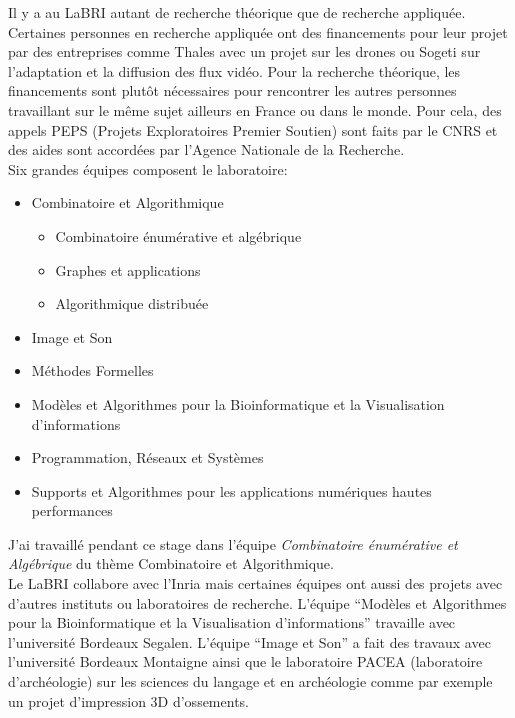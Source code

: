 \documentclass[a4paper]{article}
\begin{document}
Il y a au LaBRI autant de recherche théorique que de recherche appliquée. Certaines personnes en recherche appliquée ont des financements pour leur projet par des entreprises comme Thales avec un projet sur les drones ou Sogeti sur l'adaptation et la diffusion des flux vidéo. Pour la recherche théorique, les financements sont plutôt nécessaires pour rencontrer les autres personnes travaillant sur le même sujet ailleurs en France ou dans le monde. Pour cela, des appels PEPS (Projets Exploratoires Premier Soutien) sont faits par le CNRS et des aides sont accordées par l'Agence Nationale de la Recherche.\bigskip\\
Six grandes équipes composent le laboratoire:
\begin{itemize}
\item Combinatoire et Algorithmique
  \begin{itemize}
  \item Combinatoire énumérative et algébrique
  \item Graphes et applications
  \item Algorithmique distribuée
    \end{itemize}
\item Image et Son
\item Méthodes Formelles
\item Modèles et Algorithmes pour la Bioinformatique et la Visualisation d'informations
\item Programmation, Réseaux et Systèmes
\item Supports et Algorithmes pour les applications numériques hautes performances
\end{itemize}
\bigskip
J'ai travaillé pendant ce stage dans l'équipe \textit{Combinatoire énumérative et Algébrique} du thème Combinatoire et Algorithmique.\vspace{2\baselineskip}\\
\newpage
Le LaBRI collabore avec l'Inria mais certaines équipes ont aussi des projets avec d'autres instituts ou laboratoires de recherche. L'équipe ``Modèles et Algorithmes pour la Bioinformatique et la Visualisation d'informations'' travaille avec l'université Bordeaux Segalen. L'équipe ``Image et Son'' a fait des travaux avec l'université Bordeaux Montaigne ainsi que le laboratoire PACEA (laboratoire d'archéologie) sur les sciences du langage et en archéologie comme par exemple un projet d'impression 3D d'ossements.\bigskip\\
\end{document}
